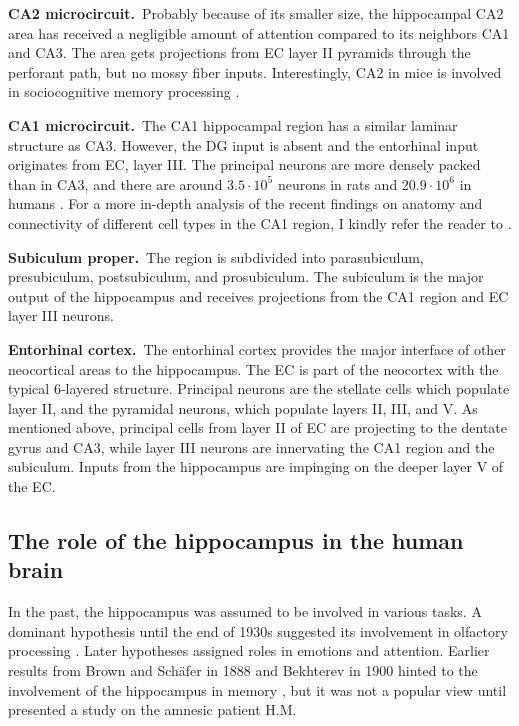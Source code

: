     \textbf{CA2 microcircuit.}\, Probably because of its smaller size, the
    hippocampal CA2 area has received a negligible amount of attention compared
    to its neighbors CA1 and CA3. The area gets projections from EC layer II
    pyramids through the perforant path, but no mossy fiber inputs.
    Interestingly, CA2 in mice is involved in sociocognitive memory processing
    \citep{Hitti2014}.

    \textbf{CA1 microcircuit.}\,
    The CA1 hippocampal region has a similar laminar structure as CA3.
    However, the DG input is absent and the entorhinal input originates from
    EC, layer III. The principal neurons are more densely packed than in CA3,
    and there are around $3.5\cdot 10^5$ neurons in rats \citep{West1991} and
    $20.9 \cdot 10^6$ in humans \citep{Simic1997}. For a more in-depth analysis
    of the recent findings on anatomy and connectivity of different cell types
    in the CA1 region, I kindly refer the reader to \cite{Bezaire2013}.

    \textbf{Subiculum proper.}\,
    The region is subdivided into parasubiculum, presubiculum, postsubiculum,
    and prosubiculum. The subiculum is the major output of the hippocampus and
    receives projections from the CA1 region and EC layer III neurons.

    \textbf{Entorhinal cortex.}\,
    The entorhinal cortex provides the major interface of other neocortical
    areas to the hippocampus. The EC is part of the neocortex with the typical
    6-layered structure. Principal neurons are the stellate cells which
    populate layer II, and the pyramidal neurons, which populate layers II,
    III, and V.  As mentioned above, principal cells from layer II of EC are
    projecting to the dentate gyrus and CA3, while layer III neurons are
    innervating the CA1 region and the subiculum. Inputs from the hippocampus
    are impinging on the deeper layer V of the EC.


  \subsection{The role of the hippocampus in the human brain}
    In the past, the hippocampus was assumed to be involved in various tasks. A
    dominant hypothesis until the end of 1930s suggested its involvement
    in olfactory processing \citep{Andersen2007}. Later hypotheses assigned
    roles in emotions and attention. Earlier results from Brown and
    Sch\"{a}fer in 1888 and Bekhterev in 1900 hinted to the involvement of the
    hippocampus in memory \citep{Andersen2007}, but it was not a popular view
    until \cite{Scoville1957} presented a study on the amnesic patient H.M.

